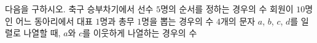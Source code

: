 다음을 구하시오.
 축구 승부차기에서 선수 $5$명의 순서를 정하는 경우의 수
 회원이 $10$명인 어느 동아리에서 대표 $1$명과 총무 $1$명을 뽑는 경우의 수
 $4$개의 문자 $a$, $b$, $c$, $d$를 일렬로 나열할 때, $a$와 $c$를 이웃하게 나열하는 경우의 수
